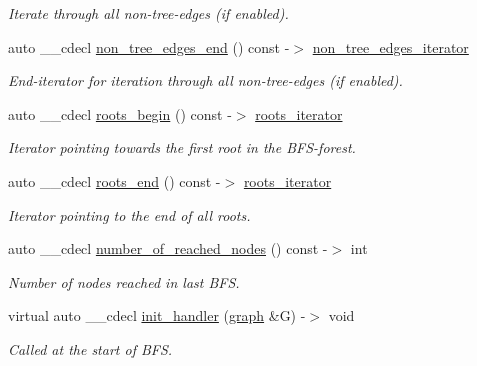 \begin{DoxyCompactItemize}
\begin{DoxyCompactList}\small\item\em Iterate through all non-\/tree-\/edges (if enabled). \end{DoxyCompactList}\item 
auto \+\_\+\+\_\+cdecl \mbox{\hyperlink{classbfs_ae4d59095371f625a831de4262ab16d31}{non\+\_\+tree\+\_\+edges\+\_\+end}} () const -\/$>$ \mbox{\hyperlink{classbfs_aecd86c7c1f1086d4b6b11c2a0eb12afe}{non\+\_\+tree\+\_\+edges\+\_\+iterator}}
\begin{DoxyCompactList}\small\item\em End-\/iterator for iteration through all non-\/tree-\/edges (if enabled). \end{DoxyCompactList}\item 
auto \+\_\+\+\_\+cdecl \mbox{\hyperlink{classbfs_a8ba1e13916302d68faafc5c5098b04fe}{roots\+\_\+begin}} () const -\/$>$ \mbox{\hyperlink{classbfs_a386ac6f3c63e38c3f5263e15c3ab9d01}{roots\+\_\+iterator}}
\begin{DoxyCompactList}\small\item\em Iterator pointing towards the first root in the B\+F\+S-\/forest. \end{DoxyCompactList}\item 
auto \+\_\+\+\_\+cdecl \mbox{\hyperlink{classbfs_ab120a4a529a9cbf407e5dcba8d33598e}{roots\+\_\+end}} () const -\/$>$ \mbox{\hyperlink{classbfs_a386ac6f3c63e38c3f5263e15c3ab9d01}{roots\+\_\+iterator}}
\begin{DoxyCompactList}\small\item\em Iterator pointing to the end of all roots. \end{DoxyCompactList}\item 
auto \+\_\+\+\_\+cdecl \mbox{\hyperlink{classbfs_a98b86a661aa5284b77c260908f0872a0}{number\+\_\+of\+\_\+reached\+\_\+nodes}} () const -\/$>$ int
\begin{DoxyCompactList}\small\item\em Number of nodes reached in last B\+FS. \end{DoxyCompactList}\item 
virtual auto \+\_\+\+\_\+cdecl \mbox{\hyperlink{classbfs_a5f6e0f575ee3d851ffbb24bdda90ed85}{init\+\_\+handler}} (\mbox{\hyperlink{classgraph}{graph}} \&G) -\/$>$ void
\begin{DoxyCompactList}\small\item\em Called at the start of B\+FS. \end{DoxyCompactList}\item 

\end{DoxyCompactItemize}
